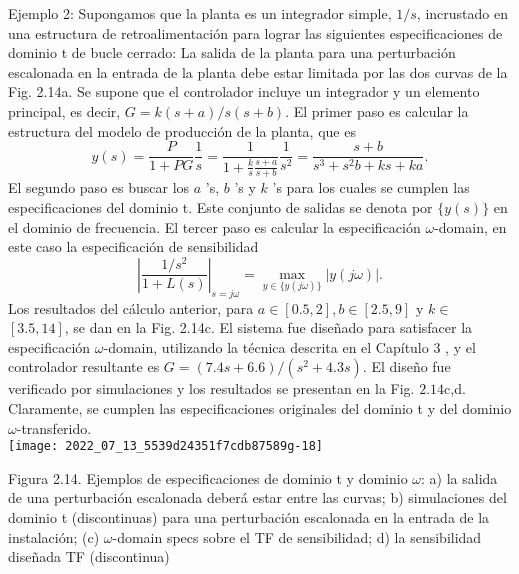 Ejemplo 2: Supongamos que la planta es un integrador simple, $ 1 / s $, incrustado en una estructura de retroalimentación para lograr las siguientes especificaciones de dominio t de bucle cerrado: La salida de la planta para una perturbación escalonada en la entrada de la planta debe estar limitada por las dos curvas de la Fig. 2.14a. Se supone que el controlador incluye un integrador y un elemento principal, es decir, $G=k(s+a) / s(s+b)$. El primer paso es calcular la estructura del modelo de producción de la planta, que es
$$
y(s)=\frac{P}{1+P G} \frac{1}{s}=\frac{1}{1+\frac{k}{s} \frac{s+a}{s+b}} \frac{1}{s^{2}}=\frac{s+b}{s^{3}+s^{2} b+k s+k a} .
$$
El segundo paso es buscar los $a $ 's, $b$ 's y $k$ 's para los cuales se cumplen las especificaciones del dominio t. Este conjunto de salidas se denota por $\{y(s)\}$ en el dominio de frecuencia. El tercer paso es calcular la especificación $\omega$-domain, en este caso la especificación de sensibilidad
$$
\left|\frac{1 / s^{2}}{1+L(s)}\right|_{s=j \omega}=\max _{y \in\{y(j \omega)\}}|y(j \omega)| .
$$
Los resultados del cálculo anterior, para $a \in[0.5,2], b \in[2.5,9]$ y $k \in$ $[3.5,14]$, se dan en la Fig. 2.14c. El sistema fue diseñado para satisfacer la especificación $\omega$-domain, utilizando la técnica descrita en el Capítulo 3 , y el controlador resultante es $G=(7.4 s+6.6) /\left(s^{2}+4.3 s\right)$. El diseño fue verificado por simulaciones y los resultados se presentan en la Fig. $2.14 \mathrm{c}$,d. Claramente, se cumplen las especificaciones originales del dominio t y del dominio $\omega$-transferido.\\

\texttt{[image: 2022\_07\_13\_5539d24351f7cdb87589g-18]}

Figura 2.14. Ejemplos de especificaciones de dominio t y dominio $\omega$: a) la salida de una perturbación escalonada deberá estar entre las curvas; b) simulaciones del dominio t (discontinuas) para una perturbación escalonada en la entrada de la instalación; (c) $\omega$-domain specs sobre el TF de sensibilidad; d) la sensibilidad diseñada TF (discontinua)

